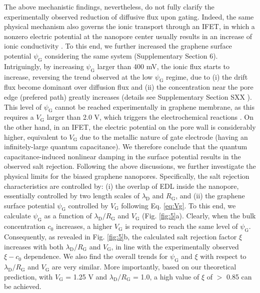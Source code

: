 \documentclass[journal=langd5,email=true, hyperref=true, keywords=false]{achemso}
\newcommand{\Fig}{Fig.}
\begin{document}
The above mechanistic findings, nevertheless, do not fully clarify the
experimentally observed reduction of diffusive flux upon
gating. Indeed, the same physical mechanism also governs the ionic
transport through an IFET, in which a nonzero electric potential at
the nanopore center usually results in an increase of ionic
conductivity \cite{Nam_2009,Lee_2015,Feng_2016}. To this end, we
further increased the graphene surface potential $\psi_{\mathrm{G}}$
considering the same system (Supplementary Section 6). Intriguingly,
by increasing $\psi_{\mathrm{G}}$ larger than 400 mV, the ionic flux
starts to increase, reversing the trend observed at the low
$\psi_{\mathrm{G}}$ regime, due to (i) the drift flux become dominant
over diffusion flux and (ii) the concentration near the pore edge
(prefered path) greatly increases (details see Supplementary Section
SXX ). This level of $\psi_{\mathrm{G}}$ cannot be reached
experimentally in graphene membrane, as this requires a
$V_{\mathrm{G}}$ larger than 2.0 V, which triggers the electrochemical
reactions \cite{Toh_2011}. On the other hand, in an IFET, the electric
potential on the pore wall is considerably higher, equivalent to
$V_{\mathrm{G}}$ due to the metallic nature of gate electrode (having
an infinitely-large quantum capacitance). We therefore conclude that
the quantum capacitance-induced nonlinear damping in the surface
potential results in the observed salt rejection.  Following the above
discussions, we further investigate the physical limits for the biased
graphene nanopores. Specifically, the salt rejection characteristics
are controlled by: (i) the overlap of EDL inside the nanopore,
essentially controlled by two length scales of $\lambda_{\mathrm{D}}$
and $R_{\mathrm{G}}$, and (ii) the graphene surface potential
$\psi_{\mathrm{G}}$ controlled by $V_{\mathrm{G}}$ following
Eq. \eqref{eq:Vg}. To this end, we calculate $\psi_{\mathrm{G}}$ as a
function of $\lambda_{\mathrm{D}} / R_{\mathrm{G}}$ and
$V_{\mathrm{G}}$ (\Fig{} \ref{fig:5}a). Clearly, when the bulk
concentration $c_{0}$ increases, a higher $V_{\mathrm{G}}$ is required
to reach the same level of $\psi_{\mathrm{G}}$. Consequently, as
revealed in \Fig{} \ref{fig:5}b, the calculated salt rejection factor
$\xi$ increases with both $\lambda_{\mathrm{D}} / R_{\mathrm{G}}$ and
$V_{\mathrm{G}}$, in line with the experimentally observed
$\xi - c_{0}$ dependence. We also find the overall trends for
$\psi_{\mathrm{G}}$ and $\xi$ with respect to
$\lambda_{\mathrm{D}}/R_{\mathrm{G}}$ and $V_{\mathrm{G}}$ are very
similar. More importantly, based on our theoretical prediction, with
$V_{\mathrm{G}}$ = 1.25 V and $\lambda_{\mathrm{D}} / R_{\mathrm{G}}$
= 1.0, a high value of $\xi$ of $>$ 0.85 can be achieved.
\end{document}
